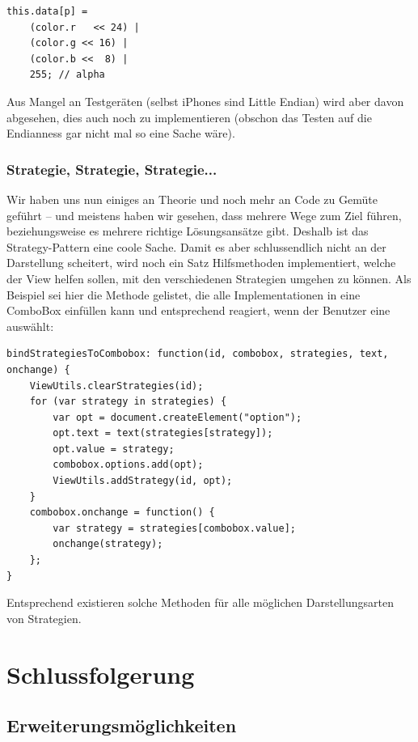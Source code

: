 \documentclass[11pt]{report} %
\theoremstyle{definition}
\begin{document}
\begin{lstlisting}
this.data[p] =
	(color.r   << 24) |
	(color.g << 16) |
	(color.b <<  8) |
	255; // alpha
\end{lstlisting}

Aus Mangel an Testgeräten (selbst iPhones sind Little Endian) wird aber davon abgesehen, dies auch noch zu implementieren (obschon das Testen auf die Endianness gar nicht mal so eine Sache wäre). \cite{mdn:PixelCanvas}

\subsection{Strategie, Strategie, Strategie...}

Wir haben uns nun einiges an Theorie und noch mehr an Code zu Gemüte geführt -- und meistens haben wir gesehen, dass mehrere Wege zum Ziel führen, beziehungsweise es mehrere richtige Lösungsansätze gibt. Deshalb ist das Strategy-Pattern eine coole Sache. Damit es aber schlussendlich nicht an der Darstellung scheitert, wird noch ein Satz Hilfsmethoden implementiert, welche der View helfen sollen, mit den verschiedenen Strategien umgehen zu können. Als Beispiel sei hier die Methode gelistet, die alle Implementationen in eine ComboBox einfüllen kann und entsprechend reagiert, wenn der Benutzer eine auswählt:

\begin{lstlisting}
bindStrategiesToCombobox: function(id, combobox, strategies, text, onchange) {
	ViewUtils.clearStrategies(id);
	for (var strategy in strategies) {
		var opt = document.createElement("option");
		opt.text = text(strategies[strategy]);
		opt.value = strategy;
		combobox.options.add(opt);
		ViewUtils.addStrategy(id, opt);
	}
	combobox.onchange = function() {
		var strategy = strategies[combobox.value];
		onchange(strategy);
	};
}
\end{lstlisting}

Entsprechend existieren solche Methoden für alle möglichen Darstellungsarten von Strategien.

\chapter{Schlussfolgerung}

\section{Erweiterungsmöglichkeiten}
\end{document}
